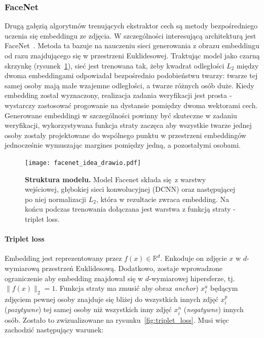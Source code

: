 \subsubsection{FaceNet}\label{sec:tripletloss}
Drugą gałęzią algorytmów trenujących ekstraktor cech są metody bezpośredniego uczenia się
embeddingu ze zdjęcia. W szczególności interesującą architekturą jest FaceNet~\cite{Facenet}.
Metoda ta bazuje na nauczeniu sieci generowania z obrazu embeddingu od razu znajdującego się w przestrzeni Euklidesowej. Traktując model jako czarną skrzynkę (rysunek~\ref{fig:facenet_idea}), sieć jest trenowana tak, żeby kwadrat odległości \(L_2\) między dwoma embeddingami
odpowiadał bezpośrednio podobieństwu twarzy: twarze tej samej osoby mają małe wzajemne
odległości, a twarze różnych osób duże. Kiedy embedding został wyznaczony, realizacja
zadania weryfikacji jest prosta - wystarczy zastosować progowanie na dystansie pomiędzy dwoma
wektorami cech. Generowane embeddingi w szczególności powinny być skuteczne w zadaniu weryfikacji, wykorzystywana funkcja straty zaczęca aby wszystkie twarze jednej osoby zostały projektowane do wspólnego punktu w przestrzeni embeddingów jednocześnie wymuszając  margines pomiędzy jedną, a pozostałymi osobami.

\begin{figure}[h]
    \centering
    \texttt{[image: facenet\_idea\_drawio.pdf]}
    \caption{\textbf{Struktura modelu.} Model Facenet składa się z warstwy wejściowej, głębokiej sieci konwolucyjnej (DCNN) oraz następującej po niej normalizacji \(L_2\), która w rezultacie zwraca embedding. Na końcu podczas trenowania dołączana jest warstwa z funkcją straty - triplet loss.}
    \label{fig:facenet_idea}
\end{figure}

\paragraph{Triplet loss}
Embedding jest reprezentowany przez \(f(x)\in\mathbb{R}^d\). Enkoduje on zdjęcie \(x\) w
\(d\)-wymiarową przestrzeń Euklidesową. Dodatkowo, zostaje wprowadzone ograniczenie aby embedding
znajdował się w \(d\)-wymiarowej hipersferze, tj. \(\|f(x)\|_2=1\). Funkcja straty ma zmusić aby
obraz \emph{anchor}) $x_i^a$ będącym zdjęciem pewnej osoby znajduje się bliżej do wszystkich
innych zdjęć \(x_i^p\) (\emph{pozytywne}) tej samej osoby niż wszystkich inny zdjęć \(x_i^n\) (\emph{negatywne}) innych osób. Zostało to zwizualizowane na rysunku~\ref{fig:triplet_loss}. Musi więc zachodzić następujący warunek:

